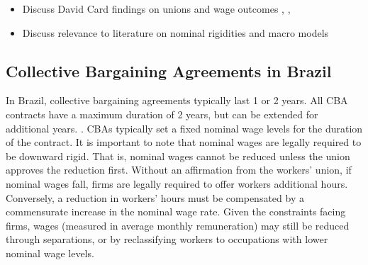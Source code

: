 \documentclass[12pt]{article}
\begin{document}
		\begin{itemize}
			\item Discuss David Card findings on unions and wage outcomes \cite{cardUnexpectedInflationReal1990}, \cite{cardEffectUnionsStructure1996}, \cite{cardStrikesBargainingSurvey1990}
			\item Discuss relevance to literature on nominal rigidities and macro models \cite{taylorStayingPowerStaggered2016} \cite{taylorChapter15Staggered1999} \cite{fukuiTheoryWageRigidity}
		\end{itemize}

		\subsection{Collective Bargaining Agreements in Brazil}
		In Brazil, collective bargaining agreements typically last 1 or 2 years. All CBA contracts have a maximum duration of 2 years, but can be extended for additional years. \cite{lagosLaborMarketInstitutions2021}. CBAs typically set a fixed nominal wage levels for the duration of the contract. It is important to note that nominal wages are legally required to be downward rigid. That is, nominal wages cannot be reduced unless the union approves the reduction first. Without an affirmation from the workers' union, if nominal wages fall, firms are legally required to offer workers additional hours. Conversely, a reduction in workers' hours must be compensated by a commensurate increase in the nominal wage rate. \cite{EnglishTranslationConsolidation2010}
		Given the constraints facing firms, wages (measured in average monthly remuneration) may still be reduced through separations, or by reclassifying workers to occupations with lower nominal wage levels. 
\end{document}
